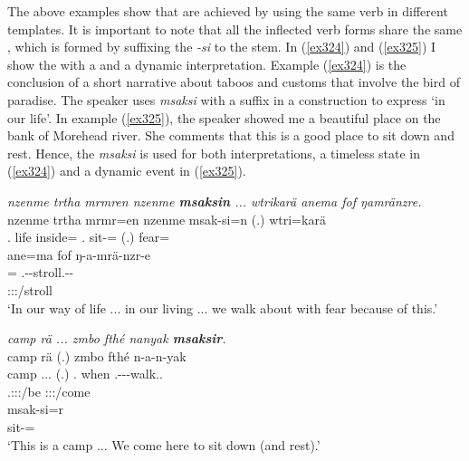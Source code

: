 The above examples show that  are achieved by using the same verb in different templates. It is important to note that all the inflected verb forms share the same , which is formed by suffixing the  \emph{-si} to the stem. In (\ref{ex324}) and (\ref{ex325}) I show the  with a  and a dynamic interpretation. Example (\ref{ex324}) is the conclusion of a short narrative about taboos and customs that involve the bird of paradise. The speaker uses \emph{msaksi} with a   suffix in a  construction to express `in our life'. In example (\ref{ex325}), the speaker showed me a beautiful place on the bank of Morehead river. She comments that this is a good place to sit down and rest. Hence, the  \emph{msaksi} is used for both interpretations, a timeless state in (\ref{ex324}) and a dynamic event in (\ref{ex325}).

\begin{exe}
	\ex \emph{nzenme trtha mrmren nzenme \textbf{msaksin} ... wtrikarä anema fof ŋamränzre.}\\
	\gll nzenme trtha mrmr=en nzenme msak-si=n (.) wtri=karä\\
	\Fnsg.\Poss{} life inside=\Loc{} \Fnsg.\Poss{} sit-\Nmlz=\Loc{} (.) fear=\Prop{}\\
	\sn
	\glll ane=ma fof ŋ-a-mrä-nzr-e\\
	\Dem=\Char{} \Emph{} \M.\Alph-\Vc-stroll.\Ext-\Ndu-\Fnsg{}\\
	{} {} \footnotesize{\Fpl:\Sbj:\Nonpast:\Ipfv/stroll}\\
	\trans `In our way of life ... in our living ... we walk about with fear because of this.'
	\label{ex324}
\end{exe}
\begin{exe}
	\ex \emph{camp rä ... zmbo fthé nanyak \textbf{msaksir}.}\\
	\glll camp rä (.) zmbo fthé n-a-n-yak\\
	camp \Tsg.\F.\Cop.\Ndu{} (.) \Prox.\All{} when \Fnsg.\Alph-\Vc-\Venit-walk.\Ext.\Ndu{}\\
	{} \footnotesize{\Tsg.\F:\Sbj:\Nonpast:\Ipfv/be} {} {} {} \footnotesize{\Fpl:\Sbj:\Nonpast:\Ipfv/come}\\
	\sn
	\gll msak-si=r\\
	sit-\Nmlz=\Purp{}\\
	\trans `This is a camp ... We come here to sit down (and rest).'\\
	\label{ex325}
\end{exe}


